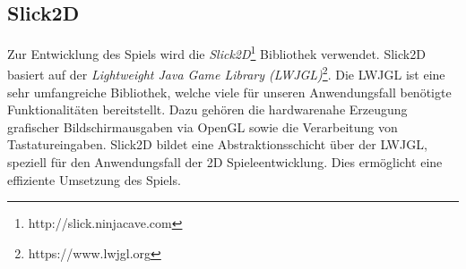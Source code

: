 \subsection{Slick2D}

Zur Entwicklung des Spiels wird die \textit{Slick2D}\footnote{http://slick.ninjacave.com} Bibliothek verwendet.
Slick2D basiert auf der \textit{Lightweight Java Game Library (LWJGL)}\footnote{https://www.lwjgl.org}.
Die LWJGL ist eine sehr umfangreiche Bibliothek, welche viele für unseren Anwendungsfall benötigte Funktionalitäten bereitstellt.
Dazu gehören die hardwarenahe Erzeugung grafischer Bildschirmausgaben via OpenGL sowie die Verarbeitung von Tastatureingaben.
Slick2D bildet eine Abstraktionsschicht über der LWJGL, speziell für den Anwendungsfall der 2D Spieleentwicklung.
Dies ermöglicht eine effiziente Umsetzung des Spiels.